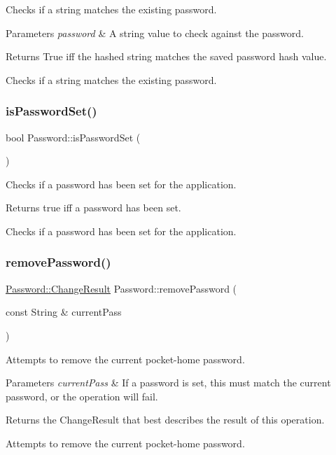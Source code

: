 Checks if a string matches the existing password.


\begin{DoxyParams}{Parameters}
{\em password} & A string value to check against the password.\\
\hline
\end{DoxyParams}
\begin{DoxyReturn}{Returns}
True iff the hashed string matches the saved password hash value.
\end{DoxyReturn}
Checks if a string matches the existing password. \mbox{\label{namespacePassword_af0fd405869c0992e97c8337fde640ebc}} 
\subsubsection{\texorpdfstring{is\+Password\+Set()}{isPasswordSet()}}
{\footnotesize\ttfamily bool Password\+::is\+Password\+Set (\begin{DoxyParamCaption}{ }\end{DoxyParamCaption})}

Checks if a password has been set for the application.

\begin{DoxyReturn}{Returns}
true iff a password has been set.
\end{DoxyReturn}
Checks if a password has been set for the application. \mbox{\label{namespacePassword_ae4e4ad4b5cce5367fb71481aef24c13d}} 
\subsubsection{\texorpdfstring{remove\+Password()}{removePassword()}}
{\footnotesize\ttfamily \mbox{\hyperlink{namespacePassword_a24f6e5d7a04a280a0ffe45daa70f0bf3}{Password\+::\+Change\+Result}} Password\+::remove\+Password (\begin{DoxyParamCaption}\item[{const String \&}]{current\+Pass }\end{DoxyParamCaption})}

Attempts to remove the current pocket-\/home password.


\begin{DoxyParams}{Parameters}
{\em current\+Pass} & If a password is set, this must match the current password, or the operation will fail.\\
\hline
\end{DoxyParams}
\begin{DoxyReturn}{Returns}
the Change\+Result that best describes the result of this operation.
\end{DoxyReturn}
Attempts to remove the current pocket-\/home password. 